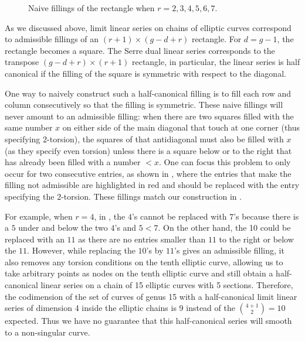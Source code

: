 \documentclass[11pt]{amsart}
\theoremstyle{definition}
\theoremstyle{definition}
\begin{document}
\begin{figure}[h!]
\caption{Naive fillings of the rectangle when $r=2, 3, 4,5,6, 7$. }
\label{figsqtc}
\end{figure}


As we discussed above, limit linear series on chains of elliptic curves correspond to admissible fillings of an $(r+1)\times (g-d+r)$ rectangle.
For $d=g-1$, the rectangle becomes a square.
The Serre dual linear series corresponds to the transpose  $(g-d+r)\times (r+1)$ rectangle, 
in particular, the linear series is half canonical if the filling of the square is symmetric with respect to the diagonal.

One way to naively construct such a half-canonical filling is to fill each row  and column consecutively so that the filling is symmetric. 
These naive fillings will never amount to an admissible filling: when there are two squares filled with the same number $x$ on either side of the main diagonal that touch at one corner (thus specifying $2$-torsion),
the squares of that antidiagonal must also be filled with $x$ (as they specify even torsion) unless there is a square below or to the right that has already been filled with a number $<x$. 
One can focus this problem to only occur for two consecutive entries, as shown in , 
where the entries that make the filling not admissible are highlighted in red and should be replaced with the entry specifying the $2$-torsion. 
These fillings match our construction in .

For example, when $r=4$, in , the $4$'s cannot be replaced with $7$'s because there is a $5$ under and below the two $4$'s and $5<7$.
On the other hand, the 10 could be replaced with an $11$ as there are no entries smaller than $11$ to the right or below the $11$.
However, while replacing the $10$'s by $11$'s gives an admissible filling, it also removes any torsion conditions on the tenth elliptic curve, 
allowing us to take arbitrary points as nodes on the tenth elliptic curve and still obtain a half-canonical linear series on a chain of 15 elliptic curves with 5 sections. 
Therefore, the codimension of the set of curves of genus 15 with a half-canonical limit linear series of dimension 4 inside the elliptic chains is 9 instead of the ${4+1\choose 2}=10$ expected.
Thus we have no guarantee that this half-canonical series will smooth to a non-singular curve.
 
\end{document}
